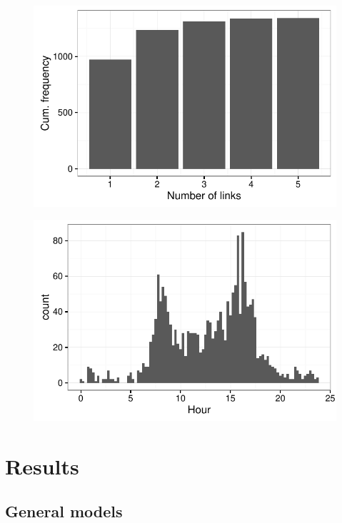 \documentclass[11pt]{article}
\begin{document}
\begin{figure}[h!]
    \center
    \includegraphics[scale=.8]{../plots/d1_loi_b5p_by_journeyref}
    \caption{}    
\end{figure}


\begin{figure}[h!]
    \center
    \includegraphics[scale=.8]{../plots/d1_loi_b5p_hour_histogram}
    \caption{}    
\end{figure}

\clearpage

\section{Results}\label{ch:results}

\subsection{General models}
\end{document}
